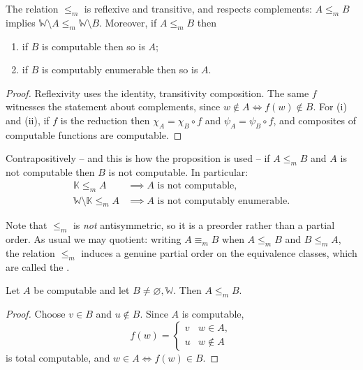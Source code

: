 \documentclass[a4paper]{scrartcl}
\newcommand{\WW}{\mathbb{W}}
\newcommand{\KK}{\mathbb{K}}
\begin{document}
\begin{proposition}\label{prop:reductionbasics}
	The relation $\leq_m$ is reflexive and transitive, and respects complements: $A \leq_m B$ implies $\WW\setminus A \leq_m \WW\setminus B$. Moreover, if $A \leq_m B$ then
	\begin{enumerate}[label=(\roman*)]
		\item if $B$ is computable then so is $A$;
		\item if $B$ is computably enumerable then so is $A$.
	\end{enumerate}
\end{proposition}

\begin{proof}
	Reflexivity uses the identity, transitivity composition. The same $f$ witnesses the statement about complements, since $w \notin A \iff f(w)\notin B$. For (i) and (ii), if $f$ is the reduction then $\chi_A = \chi_B \circ f$ and $\psi_A = \psi_B\circ f$, and composites of computable functions are computable.
\end{proof}

Contrapositively -- and this is how the proposition is used -- if $A \leq_m B$ and $A$ is not computable then $B$ is not computable. In particular:
\begin{align*}
	\KK \leq_m A &\implies A \text{ is not computable}, \\
	\WW\setminus\KK \leq_m A &\implies A \text{ is not computably enumerable}.
\end{align*}

Note that $\leq_m$ is \emph{not} antisymmetric, so it is a preorder rather than a partial order. As usual we may quotient: writing $A \equiv_m B$ when $A \leq_m B$ and $B \leq_m A$, the relation $\leq_m$ induces a genuine partial order on the equivalence classes, which are called the .

\begin{proposition}\label{prop:computablebottom}
	Let $A$ be computable and let $B \neq \varnothing, \WW$. Then $A \leq_m B$.
\end{proposition}

\begin{proof}
	Choose $v \in B$ and $u \notin B$. Since $A$ is computable,
	$$f(w) = \begin{cases} v & w \in A, \\ u & w\notin A\end{cases}$$
	is total computable, and $w \in A \iff f(w)\in B$.
\end{proof}
\end{document}
